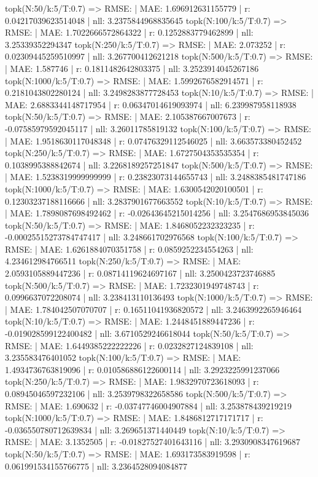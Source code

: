 topk(N:50/k:5/T:0.7) => RMSE: | MAE: 1.696912631155779 | r: 0.04217039623514048 | nll: 3.2375844968835645
topk(N:100/k:5/T:0.7) => RMSE: | MAE: 1.7022666572864322 | r: 0.1252883779462899 | nll: 3.25339352294347
topk(N:250/k:5/T:0.7) => RMSE: | MAE: 2.073252 | r: 0.02309445259510997 | nll: 3.267700412621218
topk(N:500/k:5/T:0.7) => RMSE: | MAE: 1.587746 | r: 0.1811482642803375 | nll: 3.2523914045267186
topk(N:1000/k:5/T:0.7) => RMSE: | MAE: 1.5992676582914571 | r: 0.2181043802280124 | nll: 3.2498283877728453
topk(N:10/k:5/T:0.7) => RMSE: | MAE: 2.6883344148717954 | r: 0.06347014619093974 | nll: 6.239987958118938
topk(N:50/k:5/T:0.7) => RMSE: | MAE: 2.105387667007673 | r: -0.07585979592045117 | nll: 3.26011785819132
topk(N:100/k:5/T:0.7) => RMSE: | MAE: 1.9518630117048348 | r: 0.07476329112546025 | nll: 3.663573380452452
topk(N:250/k:5/T:0.7) => RMSE: | MAE: 1.6727504353535354 | r: 0.1038995388842674 | nll: 3.2268189257251847
topk(N:500/k:5/T:0.7) => RMSE: | MAE: 1.5238319999999999 | r: 0.23823073144655743 | nll: 3.2488385481747186
topk(N:1000/k:5/T:0.7) => RMSE: | MAE: 1.6300542020100501 | r: 0.12303237188116666 | nll: 3.2837901677663552
topk(N:10/k:5/T:0.7) => RMSE: | MAE: 1.7898087698492462 | r: -0.02643645215014256 | nll: 3.2547686953845036
topk(N:50/k:5/T:0.7) => RMSE: | MAE: 1.8468052232323235 | r: -0.00025515273784747417 | nll: 3.248661702976568
topk(N:100/k:5/T:0.7) => RMSE: | MAE: 1.6261884070351758 | r: 0.0859252234554263 | nll: 4.234612984766511
topk(N:250/k:5/T:0.7) => RMSE: | MAE: 2.0593105889447236 | r: 0.08714119624697167 | nll: 3.2500423723746885
topk(N:500/k:5/T:0.7) => RMSE: | MAE: 1.7232301949748743 | r: 0.0996637072208074 | nll: 3.238413110136493
topk(N:1000/k:5/T:0.7) => RMSE: | MAE: 1.784042507070707 | r: 0.16511041936820572 | nll: 3.2463992265946464
topk(N:10/k:5/T:0.7) => RMSE: | MAE: 1.2448451889447236 | r: -0.019028599122400482 | nll: 3.6710529246618044
topk(N:50/k:5/T:0.7) => RMSE: | MAE: 1.6449385222222226 | r: 0.0232827124839108 | nll: 3.235583476401052
topk(N:100/k:5/T:0.7) => RMSE: | MAE: 1.4934736763819096 | r: 0.010586886122600114 | nll: 3.2923225991237066
topk(N:250/k:5/T:0.7) => RMSE: | MAE: 1.9832970723618093 | r: 0.08945046597232106 | nll: 3.2539798322658586
topk(N:500/k:5/T:0.7) => RMSE: | MAE: 1.690632 | r: -0.03747746004907884 | nll: 3.253878439219219
topk(N:1000/k:5/T:0.7) => RMSE: | MAE: 1.8486812717171717 | r: -0.036550780712639834 | nll: 3.269651371440449
topk(N:10/k:5/T:0.7) => RMSE: | MAE: 3.1352505 | r: -0.01827527401643116 | nll: 3.2930908347619687
topk(N:50/k:5/T:0.7) => RMSE: | MAE: 1.693173583919598 | r: 0.061991534155766775 | nll: 3.2364528094084877
